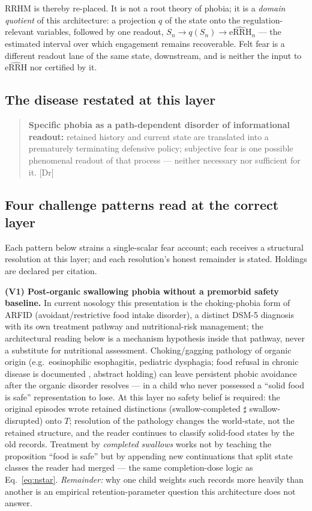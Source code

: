 \documentclass[9pt,twocolumn]{article}
\newcommand{\eRRHhat}{\widehat{\mathrm{eRRH}}}
\newcommand{\tier}[1]{{\sffamily\scriptsize\color{RRHMSlate}[#1]}}
\begin{document}
RRHM is thereby re-placed. It is not a root theory of phobia; it is a \emph{domain quotient} of this architecture: a projection $q$ of the state onto the regulation-relevant variables, followed by one readout, $S_n \to q(S_n) \to \eRRHhat_n$ --- the estimated interval over which engagement remains recoverable. Felt fear is a different readout lane of the same state, downstream, and is neither the input to $\eRRHhat$ nor certified by it.

\subsection{The disease restated at this layer}
\begin{quote}
\textbf{Specific phobia as a path-dependent disorder of informational readout:} retained history and current state are translated into a prematurely terminating defensive policy; subjective fear is one possible phenomenal readout of that process --- neither necessary nor sufficient for it. \tier{Dr}
\end{quote}

\subsection{Four challenge patterns read at the correct layer}
Each pattern below strains a single-scalar fear account; each receives a structural resolution at this layer; and each resolution's honest remainder is stated. Holdings are declared per citation.

\textbf{(V1) Post-organic swallowing phobia without a premorbid safety baseline.} In current nosology this presentation is the choking-phobia form of ARFID (avoidant/restrictive food intake disorder), a distinct DSM-5 diagnosis with its own treatment pathway and nutritional-risk management; the architectural reading below is a mechanism hypothesis inside that pathway, never a substitute for nutritional assessment. Choking/gagging pathology of organic origin (e.g.\ eosinophilic esophagitis, pediatric dysphagia; food refusal in chronic disease is documented \cite{staiano2003}, abstract holding) can leave persistent phobic avoidance after the organic disorder resolves --- in a child who never possessed a ``solid food is safe'' representation to lose. At this layer no safety belief is required: the original episodes wrote retained distinctions (swallow-completed $\sharp$ swallow-disrupted) onto $T$; resolution of the pathology changes the world-state, not the retained structure, and the reader continues to classify solid-food states by the old records. Treatment by \emph{completed swallows} works not by teaching the proposition ``food is safe'' but by appending new continuations that split state classes the reader had merged --- the same completion-dose logic as Eq.~\ref{eq:nstar}. \emph{Remainder:} why one child weights such records more heavily than another is an empirical retention-parameter question this architecture does not answer.
\end{document}
